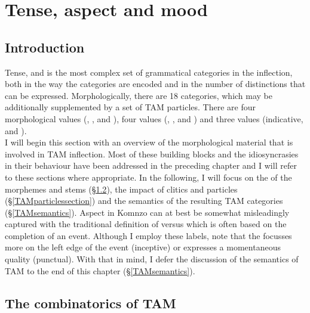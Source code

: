 
\chapter{Tense, aspect and mood} \label{TAMpalooza}

\section{Introduction} \label{TAMintro}

Tense,  and  is the most complex set of grammatical categories in the  inflection, both in the way the categories are encoded and in the number of distinctions that can be expressed. Morphologically, there are 18 categories, which may be additionally supplemented by a set of TAM particles. There are four morphological  values (, ,  and ), four  values (, ,  and ) and three  values (indicative,  and ).\\

I will begin this section with an overview of the morphological material that is involved in TAM inflection. Most of these building blocks and the idiosyncrasies in their behaviour have been addressed in the preceding chapter and I will refer to these sections where appropriate. In the following, I will focus on the  of the morphemes and stems (\S\ref{combitam}), the impact of clitics and particles (\S\ref{TAMparticlessection}) and the semantics of the resulting TAM categories (\S\ref{TAMsemantics}). Aspect in Komnzo can at best be somewhat misleadingly captured with the traditional definition of  versus  which is often based on the completion of an event. Although I employ these labels, note that the  focusses more on the left edge of the event (inceptive) or expresses a momentaneous quality (punctual). With that in mind, I defer the discussion of the semantics of TAM to the end of this chapter (\S\ref{TAMsemantics}).

\section{The combinatorics of TAM} \label{combitam}

